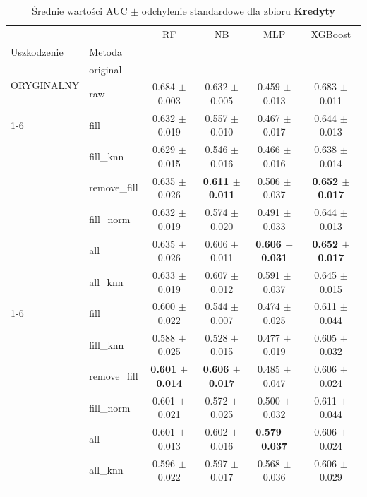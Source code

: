 \begin{table}[htbp]
\caption{Średnie wartości AUC $\pm$ odchylenie standardowe dla zbioru \textbf{Kredyty}}
\label{tab:wyniki_kredyty}
\begin{tabular}{llcccc}
\toprule
 &  & RF & NB & MLP & XGBoost \\
Uszkodzenie & Metoda &  &  &  &  \\
\midrule
\multirow[t]{2}{*}{ORYGINALNY} & original & - & - & - & - \\
 & raw & 0.684 $\pm$ 0.003 & 0.632 $\pm$ 0.005 & 0.459 $\pm$ 0.013 & 0.683 $\pm$ 0.011 \\
\cline{1-6}
\multirow[t]{7}{*}{10%
 & fill & 0.632 $\pm$ 0.019 & 0.557 $\pm$ 0.010 & 0.467 $\pm$ 0.017 & 0.644 $\pm$ 0.013 \\
 & fill_knn & 0.629 $\pm$ 0.015 & 0.546 $\pm$ 0.016 & 0.466 $\pm$ 0.016 & 0.638 $\pm$ 0.014 \\
 & remove_fill & 0.635 $\pm$ 0.026 & \textbf{0.611 $\pm$ 0.011} & 0.506 $\pm$ 0.037 & \textbf{0.652 $\pm$ 0.017} \\
 & fill_norm & 0.632 $\pm$ 0.019 & 0.574 $\pm$ 0.020 & 0.491 $\pm$ 0.033 & 0.644 $\pm$ 0.013 \\
 & all & 0.635 $\pm$ 0.026 & 0.606 $\pm$ 0.011 & \textbf{0.606 $\pm$ 0.031} & \textbf{0.652 $\pm$ 0.017} \\
 & all_knn & 0.633 $\pm$ 0.019 & 0.607 $\pm$ 0.012 & 0.591 $\pm$ 0.037 & 0.645 $\pm$ 0.015 \\
\cline{1-6}
\multirow[t]{7}{*}{20%
 & fill & 0.600 $\pm$ 0.022 & 0.544 $\pm$ 0.007 & 0.474 $\pm$ 0.025 & 0.611 $\pm$ 0.044 \\
 & fill_knn & 0.588 $\pm$ 0.025 & 0.528 $\pm$ 0.015 & 0.477 $\pm$ 0.019 & 0.605 $\pm$ 0.032 \\
 & remove_fill & \textbf{0.601 $\pm$ 0.014} & \textbf{0.606 $\pm$ 0.017} & 0.485 $\pm$ 0.047 & 0.606 $\pm$ 0.024 \\
 & fill_norm & 0.601 $\pm$ 0.021 & 0.572 $\pm$ 0.025 & 0.500 $\pm$ 0.032 & 0.611 $\pm$ 0.044 \\
 & all & 0.601 $\pm$ 0.013 & 0.602 $\pm$ 0.016 & \textbf{0.579 $\pm$ 0.037} & 0.606 $\pm$ 0.024 \\
 & all_knn & 0.596 $\pm$ 0.022 & 0.597 $\pm$ 0.017 & 0.568 $\pm$ 0.036 & 0.606 $\pm$ 0.029 \\
}}
\end{tabular}
\end{table}
